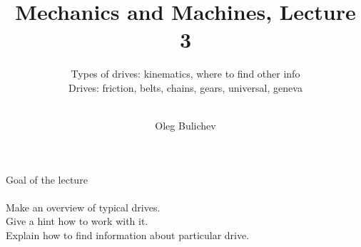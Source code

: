 \documentclass[aspectratio=169]{beamer}
\title[MaM]{Mechanics and Machines, Lecture 3} %
\subtitle{Types of drives: kinematics, where to find other info
\\ Drives: friction, belts, chains, gears, universal, geneva       \\ \  
         } %
\author{Oleg Bulichev}
\newcommand{\fbckg}[1]{\usebackgroundtemplate{\texttt{[image: \#1]}}}%
\begin{document}
\setlength{\abovedisplayskip}{0pt}
\setlength{\belowdisplayskip}{0pt}
\setlength{\abovedisplayshortskip}{0pt}
\setlength{\belowdisplayshortskip}{0pt}

\fbckg{fibeamer/figs/title_page.png}

\fbckg{fibeamer/figs/common.png}

\note{\scriptsize \begin{itemize}
        \item \
    \end{itemize}}

\begin{frame}[c]{Goal of the lecture}
    \framesubtitle{}
    \LARGE
    \centering
    Make an overview of typical drives. \\ Give a hint how to work with it. \\ Explain how to find information about particular drive.
\end{frame}
\end{document}
